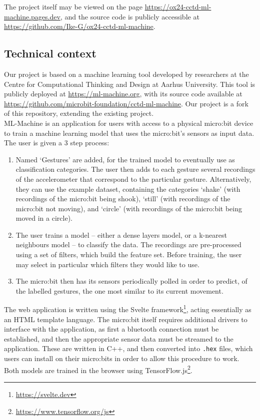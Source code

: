 \documentclass{article}
\begin{document}
The project itself may be viewed on the page \url{https://ox24-cctd-ml-machine.pages.dev}, and the source code is publicly accessible at \url{https://github.com/Ike-G/ox24-cctd-ml-machine}.

\subsection{Technical context}%
\label{subsec:context}

Our project is based on a machine learning tool developed by researchers at the Centre for Computational Thinking and Design at Aarhus University. This tool is publicly deployed at \url{https://ml-machine.org}, with its source code available at \url{https://github.com/microbit-foundation/cctd-ml-machine}. Our project is a fork of this repository, extending the existing project. \\

ML-Machine is an application for users with access to a physical micro:bit device to train a machine learning model that uses the micro:bit's sensors as input data. The user is given a 3 step process:
\begin{enumerate}
        \item Named `Gestures' are added, for the trained model to eventually use as classification categories. The user then adds to each gesture several recordings of the accelerometer that correspond to the particular gesture. Alternatively, they can use the example dataset, containing the categories `shake' (with recordings of the micro:bit being shook), `still' (with recordings of the micro:bit not moving), and `circle' (with recordings of the micro:bit being moved in a circle).
  \item The user trains a model -- either a dense layers model, or a k-nearest neighbours model -- to classify the data. The recordings are pre-processed using a set of filters, which build the feature set. Before training, the user may select in particular which filters they would like to use.
        \item The micro:bit then has its sensors periodically polled in order to predict, of the labelled gestures, the one most similar to its current movement.
\end{enumerate}

The web application is written using the Svelte framework\footnote{\url{https://svelte.dev}}, acting essentially as an HTML template language. The micro:bit itself requires additional drivers to interface with the application, as first a bluetooth connection must be established, and then the appropriate sensor data must be streamed to the application. These are written in C++, and then converted into \verb|.hex| files, which users can install on their micro:bits in order to allow this procedure to work. Both models are trained in the browser using TensorFlow.js\footnote{\url{https://www.tensorflow.org/js}}. \\
\end{document}
